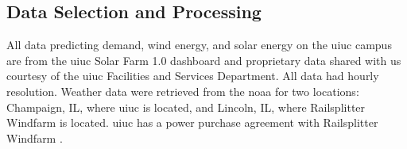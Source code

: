 \subsection{Data Selection and Processing}

All data predicting demand, wind energy, and solar energy on the \gls{uiuc}
campus are from the \gls{uiuc} Solar Farm 1.0 dashboard
\cite{alsoenergy_university_2019} and proprietary data shared with us courtesy
of the \gls{uiuc} Facilities and Services Department. All data had hourly
resolution. Weather data were retrieved from the
\gls{noaa}\cite{national_center_for_environmental_information_find_nodate} for
two locations: Champaign, IL, where \gls{uiuc} is located, and Lincoln, IL,
where Railsplitter Windfarm is located. \gls{uiuc} has a power purchase
agreement with Railsplitter Windfarm \cite{breitweiser_wind_2016}.

